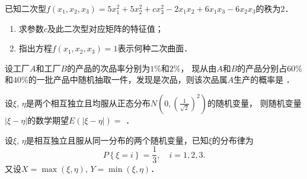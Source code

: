\documentclass[plain,noanswer,medmath]{../../template/jnuexam}
\begin{document}

\begin{problem}
已知二次型$f(x_1,x_2,x_3) = 5x_1^2+ 5x_2^2+ cx_3^2- 2x_1x_2 + 6x_1x_3 - 6x_2x_3$的秩为$2$．
\begin{enumerate}
\item 求参数$c$及此二次型对应矩阵的特征值；
\item 指出方程$f(x_1,x_2,x_3) = 1$表示何种二次曲面．
\end{enumerate}
\end{problem}




\begin{problem}
设工厂$A$和工厂$B$的产品的次品率分别为$1\%$和$2\%$，
现从由$A$和$B$的产品分别占$60\%$和$40\%$的一批产品中随机抽取一件，发现是次品，则该次品属$A$生产的概率是 \fillin{}．
\end{problem}


\begin{problem}
设$\xi$, $\eta$是两个相互独立且均服从正态分布$N\left(0,\left(\tfrac{1}{\sqrt{2}}\right)^2\right)$的随机变量，
则随机变量$|\xi-\eta|$的数学期望$E(|\xi-\eta|) =$ \fillin{}．
\end{problem}



\begin{problem}
设$\xi$, $\eta$是相互独立且服从同一分布的两个随机变量，已知$\xi$的分布律为
$$P\left\{\xi = i \right\} = \frac{1}{3}, \quad i=1,2,3.$$
又设$X = \max(\xi ,\eta)$, $Y = \min(\xi ,\eta)$．
\end{problem}
\end{document}
